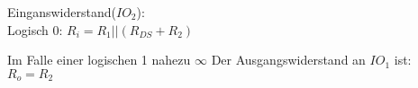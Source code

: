 \begin{frame}[c]{}
  Einganswiderstand($IO_2$):\\
  Logisch 0:
  \begin{math}
    R_i = R_1 || (R_{DS} + R_2)
  \end{math}

  Im Falle einer logischen 1 nahezu $\infty$
  \newline
  \newline
  Der Ausgangswiderstand an $IO_1$ ist:\\
  \begin{math}
    R_o = R_2
  \end{math}
\end{frame}
